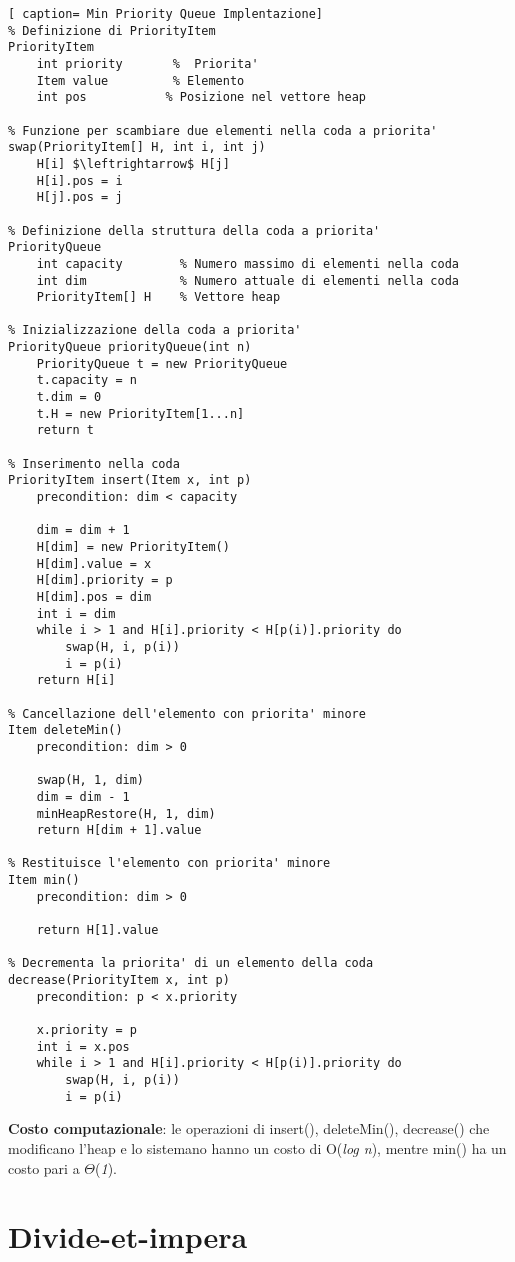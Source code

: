 \documentclass[../cheatSheetAlgoritmi.tex]{subfiles}
\begin{document}
\begin{lstlisting}[ caption= Min Priority Queue Implentazione]
% Definizione di PriorityItem
PriorityItem
	int priority       %  Priorita'
	Item value         % Elemento
	int pos           % Posizione nel vettore heap
	
% Funzione per scambiare due elementi nella coda a priorita'
swap(PriorityItem[] H, int i, int j)
	H[i] $\leftrightarrow$ H[j]
	H[i].pos = i
	H[j].pos = j
	
% Definizione della struttura della coda a priorita'
PriorityQueue
	int capacity 		% Numero massimo di elementi nella coda
	int dim 			% Numero attuale di elementi nella coda
	PriorityItem[] H    % Vettore heap

% Inizializzazione della coda a priorita'
PriorityQueue priorityQueue(int n)
	PriorityQueue t = new PriorityQueue
	t.capacity = n
	t.dim = 0
	t.H = new PriorityItem[1...n]
	return t
	
% Inserimento nella coda
PriorityItem insert(Item x, int p)
	precondition: dim < capacity
	
	dim = dim + 1
	H[dim] = new PriorityItem()
	H[dim].value = x
	H[dim].priority = p
	H[dim].pos = dim
	int i = dim
	while i > 1 and H[i].priority < H[p(i)].priority do
		swap(H, i, p(i))
		i = p(i)
	return H[i]
	
% Cancellazione dell'elemento con priorita' minore
Item deleteMin()
	precondition: dim > 0
	
	swap(H, 1, dim)
	dim = dim - 1
	minHeapRestore(H, 1, dim)
	return H[dim + 1].value

% Restituisce l'elemento con priorita' minore
Item min()
	precondition: dim > 0
	
	return H[1].value

% Decrementa la priorita' di un elemento della coda
decrease(PriorityItem x, int p)
	precondition: p < x.priority
	
	x.priority = p
	int i = x.pos
	while i > 1 and H[i].priority < H[p(i)].priority do
		swap(H, i, p(i))
		i = p(i)	
\end{lstlisting}
\textbf{Costo computazionale}: le operazioni di insert(), deleteMin(), decrease() che modificano  l'heap e lo sistemano hanno un costo di O(\textit{log n}), mentre min() ha un costo pari a $\Theta$(\textit{1}).\

\newpage
\section{Divide-et-impera}
\end{document}
